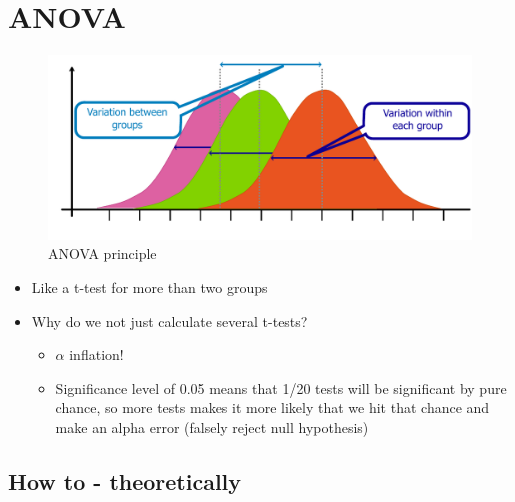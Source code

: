 \documentclass[
]{book}
\providecommand{\tightlist}{%
  \setlength{\itemsep}{0pt}\setlength{\parskip}{0pt}}
\begin{document}
\section{ANOVA}\label{anova}

\begin{figure}
\centering
\includegraphics{./img/anova.pdf}
\caption{\label{fig:anovaprince}ANOVA principle}
\end{figure}

\begin{itemize}
\tightlist
\item
  Like a t-test for more than two groups
\item
  Why do we not just calculate several t-tests?

  \begin{itemize}
  \tightlist
  \item
    \(\alpha\) inflation!
  \item
    Significance level of 0.05 means that 1/20 tests will be significant by pure chance, so more tests makes it more likely that we hit that chance and make an alpha error (falsely reject null hypothesis)
  \end{itemize}
\end{itemize}

\subsection{How to - theoretically}\label{how-to---theoretically}
\end{document}

